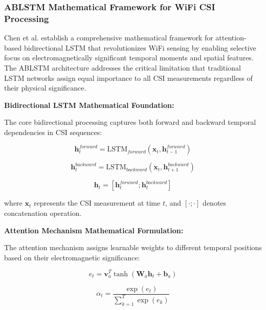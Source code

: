 \documentclass[journal]{IEEEtran}
\begin{document}
\subsubsection{ABLSTM Mathematical Framework for WiFi CSI Processing}

Chen et al. \cite{chen2018wifi} establish a comprehensive mathematical framework for attention-based bidirectional LSTM that revolutionizes WiFi sensing by enabling selective focus on electromagnetically significant temporal moments and spatial features. The ABLSTM architecture addresses the critical limitation that traditional LSTM networks assign equal importance to all CSI measurements regardless of their physical significance.

\textbf{Bidirectional LSTM Mathematical Foundation:}

The core bidirectional processing captures both forward and backward temporal dependencies in CSI sequences:

\begin{equation}
\mathbf{h}_t^{forward} = \text{LSTM}_{forward}(\mathbf{x}_t, \mathbf{h}_{t-1}^{forward})
\label{eq:ablstm_forward}
\end{equation}

\begin{equation}
\mathbf{h}_t^{backward} = \text{LSTM}_{backward}(\mathbf{x}_t, \mathbf{h}_{t+1}^{backward})
\label{eq:ablstm_backward}
\end{equation}

\begin{equation}
\mathbf{h}_t = [\mathbf{h}_t^{forward}; \mathbf{h}_t^{backward}]
\label{eq:ablstm_concat}
\end{equation}

where $\mathbf{x}_t$ represents the CSI measurement at time $t$, and $[\cdot; \cdot]$ denotes concatenation operation.

\textbf{Attention Mechanism Mathematical Formulation:}

The attention mechanism assigns learnable weights to different temporal positions based on their electromagnetic significance:

\begin{equation}
e_t = \mathbf{v}_a^T \tanh(\mathbf{W}_a \mathbf{h}_t + \mathbf{b}_a)
\label{eq:ablstm_attention_score}
\end{equation}

\begin{equation}
\alpha_t = \frac{\exp(e_t)}{\sum_{k=1}^{T} \exp(e_k)}
\label{eq:ablstm_attention_weight}
\end{equation}
\end{document}
